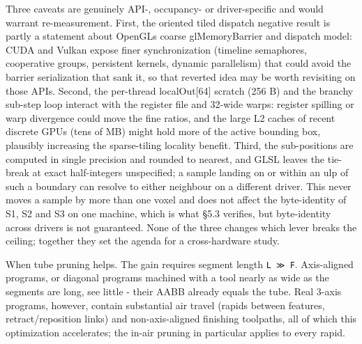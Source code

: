 \documentclass[
]{article}
\begin{document}
Three caveats are genuinely API-, occupancy- or driver-specific and
would warrant re-measurement. First, the oriented tiled dispatch
negative result is partly a statement about OpenGL\textquotesingle s
coarse glMemoryBarrier and dispatch model: CUDA and Vulkan expose finer
synchronization (timeline semaphores, cooperative groups, persistent
kernels, dynamic parallelism) that could avoid the barrier serialization
that sank it, so that reverted idea may be worth revisiting on those
APIs. Second, the per-thread localOut{[}64{]} scratch (256 B) and the
branchy sub-step loop interact with the register file and 32-wide warps:
register spilling or warp divergence could move the fine ratios, and the
large L2 caches of recent discrete GPUs (tens of MB) might hold more of
the active bounding box, plausibly increasing the sparse-tiling locality
benefit. Third, the sub-positions are computed in single precision and
rounded to nearest, and GLSL leaves the tie-break at exact half-integers
unspecified; a sample landing on or within an ulp of such a boundary can
resolve to either neighbour on a different driver. This never moves a
sample by more than one voxel and does not affect the byte-identity of
S1, S2 and S3 on one machine, which is what §5.3 verifies, but
byte-identity across drivers is not guaranteed. None of the three
changes which lever breaks the ceiling; together they set the agenda for
a cross-hardware study.

When tube pruning helps. The gain requires segment length
\texttt{L\ ≫\ F}. Axis-aligned programs, or diagonal programs machined
with a tool nearly as wide as the segments are long, see little - their
AABB already equals the tube. Real 3-axis programs, however, contain
substantial air travel (rapids between features, retract/reposition
links) and non-axis-aligned finishing toolpaths, all of which this
optimization accelerates; the in-air pruning in particular applies to
every rapid.
\end{document}
